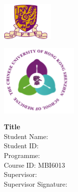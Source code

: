 \begin{titlepage}

    \begin{minipage}{0.5\textwidth}
    \raggedright
    \includegraphics{figure/cuhk-logo.png}
    \end{minipage}%
    \begin{minipage}{0.5\textwidth}
    \raggedleft
    \includegraphics{figure/med-logo.png}
    \end{minipage}
    \vspace*{1.5cm}
    
    \centering
    \textbf{\huge Title}\\[6.0cm]

	{\large Student Name:}\\[0.5 cm]
	{\large Student ID: }\\[0.5 cm]
    {\large Programme: }\\[0.5 cm]
    {\large Course ID: MBI6013 }\\[0.5 cm]
    {\large Supervisor: }\\[0.5 cm]
    \vspace*{0.5 cm}
    {\large Supervisor Signature: }\\[1.5 cm]
    
 
	\vfill
	
\end{titlepage}